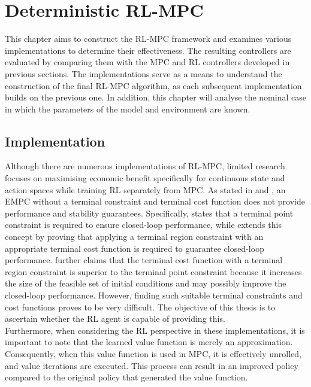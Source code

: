 \chapter{Deterministic RL-MPC}
\label{chapter:deterministic_RL_MPC}
This chapter aims to construct the RL-MPC framework and examines various implementations to determine their effectiveness. The resulting controllers are evaluated by comparing them with the MPC and RL controllers developed in previous sections. The implementations serve as a means to understand the construction of the final RL-MPC algorithm, as each subsequent implementation builds on the previous one. In addition, this chapter will analyse the nominal case in which the parameters of the model and environment are known.


\section{Implementation} \label{section:rlmpc implementation}
Although there are numerous implementations of RL-MPC, limited research focuses on maximising economic benefit specifically for continuous state and action spaces while training RL separately from MPC. As stated in \citet{ellisTutorialReviewEconomic2014} and \citet{amritEconomicOptimizationUsing2011}, an EMPC without a terminal constraint and terminal cost function does not provide performance and stability guarantees. Specifically, \citet{ellisTutorialReviewEconomic2014} states that a terminal point constraint is required to ensure closed-loop performance, while \citet{amritEconomicOptimizationUsing2011} extends this concept by proving that applying a terminal region constraint with an appropriate terminal cost function is required to guarantee closed-loop performance.\citet{amritEconomicOptimizationUsing2011} further claims that the terminal cost function with a terminal region constraint is superior to the terminal point constraint because it increases the size of the feasible set of initial conditions and may possibly improve the closed-loop performance. However, finding such suitable terminal constraints and cost functions proves to be very difficult. The objective of this thesis is to ascertain whether the RL agent is capable of providing this. \\
Furthermore, when considering the RL perspective in these implementations, it is important to note that the learned value function is merely an approximation. Consequently, when this value function is used in MPC, it is effectively unrolled, and value iterations are executed. This process can result in an improved policy compared to the original policy that generated the value function.

